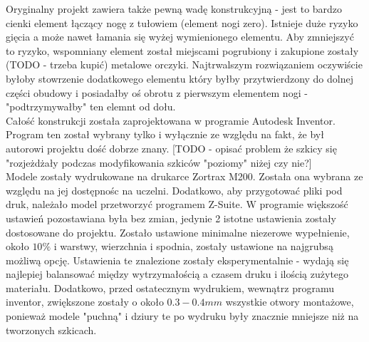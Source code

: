 Oryginalny projekt zawiera także pewną wadę konstrukcyjną - jest to bardzo cienki element łączący nogę z tułowiem (element nogi zero). Istnieje duże ryzyko gięcia a może nawet łamania się wyżej wymienionego elementu. Aby zmniejszyć to ryzyko, wspomniany element został miejscami pogrubiony i zakupione zostały (TODO - trzeba kupić) metalowe orczyki. Najtrwalszym rozwiązaniem oczywiście byłoby stowrzenie dodatkowego elementu który byłby przytwierdzony do dolnej części obudowy i posiadałby oś obrotu z pierwszym elementem nogi -  "podtrzymywałby" ten elemnt od dołu.\\

Całość konstrukcji została zaprojektowana w programie Autodesk Inventor. Program ten został wybrany tylko i wyłącznie ze względu na fakt, że był autorowi projektu dość dobrze znany. [TODO - opisać problem że szkicy się "rozjeżdżały podczas modyfikowania szkiców "poziomy" niżej czy nie?]\\

Modele zostały wydrukowane na drukarce Zortrax M200. Została ona wybrana ze względu na jej dostępnośc na uczelni. Dodatkowo, aby przygotować pliki pod druk, należało model przetworzyć programem Z-Suite. W programie większość ustawień pozostawiana była bez zmian, jedynie 2 istotne ustawienia zostały dostosowane do projektu. Zostało ustawione minimalne niezerowe wypełnienie, około $10\%$ i warstwy, wierzchnia i spodnia, zostały ustawione na najgrubsą możliwą opcję. Ustawienia te znalezione zostały eksperymentalnie - wydają się najlepiej balansować między wytrzymałością a czasem druku i ilością zużytego materiału. Dodatkowo, przed ostatecznym wydrukiem, wewnątrz programu inventor, zwiększone zostały o około $0.3-0.4 mm$ wszystkie otwory montażowe, ponieważ modele "puchną" i dziury te po wydruku były znacznie mniejsze niż na tworzonych szkicach.\\
